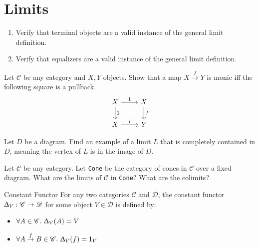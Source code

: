 \def\pathToRoot{../../}

\usepackage{upgreek}



\author{Leonhard Staut}

\section{Limits}

\begin{exercise}
  \begin{enumerate}
  \item Verify that terminal objects are a valid instance of the general limit definition.
  \item Verify that equalizers are a valid instance of the general limit definition.
  \end{enumerate}
\end{exercise}

\begin{exercise}
  Let $\mathscr{C}$ be any category and $X, Y$ objects.
  Show that a map $X \overset{f}{\to} Y$ is monic iff the following square is a pullback.
  \[
    \begin{tikzcd}
      X \arrow{r}{1}  \arrow{d}{1}  & X \arrow{d}{f}    \\
      X \arrow{r}{f}                & Y                  
    \end{tikzcd}
  \]
\end{exercise}

\begin{exercise}
  Let $D$ be a diagram.
  Find an example of a limit $L$ that is completely contained in $D$,
  meaning the vertex of $L$ is in the image of $D$.
\end{exercise}

\begin{exercise}
  Let $\mathscr{C}$ be any category. Let \texttt{Cone} be the category of cones
  in $\mathscr{C}$ over a fixed diagram.
  What are the limits of $\mathscr{C}$ in \texttt{Cone}? What are the colimits?
\end{exercise}

\begin{definition}
  {Constant Functor}
  For any two categories $\mathscr{C}$ and $\mathscr{D}$,
  the constant functor $\Updelta _ V : \mathscr{C} \to \mathscr{D} $ for some object $V \in \mathscr{D}$
  is defined by:
  \begin{itemize}
    \item $\forall A \in \mathscr{C}. \ \Updelta _ V (A) = V$
    \item $\forall A \overset{f}{\to} B \in \mathscr{C}. \ \Updelta _ V (f) = 1_V$
  \end{itemize}
  
\end{definition}

